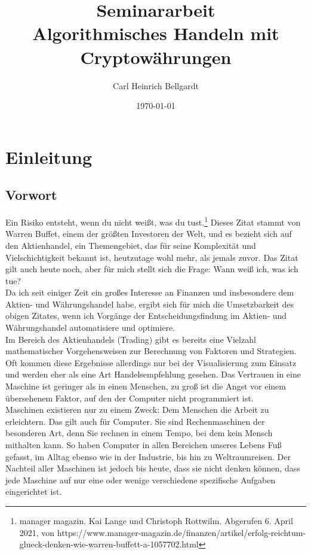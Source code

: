 \documentclass[12pt]{article}
\begin{document}
\begin{titlepage}	
	\title{\LARGE Seminararbeit\\ \large Algorithmisches Handeln mit Cryptowährungen}
	\date{\small \today}
	\author{\small Carl Heinrich Bellgardt}	
	\clearpage\maketitle
	\thispagestyle{empty}
\end{titlepage}

\setcounter{page}{2}
\tableofcontents
\pagebreak
\section{Einleitung}
\subsection{Vorwort}
	\glqq Ein Risiko entsteht, wenn du nicht weißt, was du tust.\grqq{}\footnote{manager magazin. Kai Lange und Christoph Rottwilm. Abgerufen 6. April 2021, von https://www.manager-magazin.de/finanzen/artikel/erfolg-reichtum-glueck-denken-wie-warren-buffett-a-1057702.html} Dieses Zitat stammt von Warren Buffet, einem der größten Investoren der Welt, und es bezieht sich auf den Aktienhandel, ein Themengebiet, das für seine Komplexität und Vielschichtigkeit bekannt ist, heutzutage wohl mehr, als jemals zuvor. Das Zitat gilt auch heute noch, aber für mich stellt sich die Frage: Wann weiß ich, was ich tue?\\
	Da ich seit einiger Zeit ein großes Interesse an Finanzen und insbesondere dem Aktien- und Währungshandel habe, ergibt sich für mich die Umsetzbarkeit des obigen Zitates, wenn ich Vorgänge der Entscheidungsfindung im Aktien- und Währungshandel automatisiere und optimiere.\\
	Im Bereich des Aktienhandels (Trading) gibt es bereits eine Vielzahl mathematischer Vorgehensweisen zur Berechnung von Faktoren und Strategien. Oft kommen diese Ergebnisse allerdings nur bei der Visualisierung zum Einsatz und werden eher als eine Art Handelsempfehlung gesehen. Das Vertrauen in eine Maschine ist geringer als in einen Menschen, zu groß ist die Angst vor einem übersehenem Faktor, auf den der Computer nicht programmiert ist.\\
	Maschinen existieren nur zu einem Zweck: Dem Menschen die Arbeit zu erleichtern. Das gilt auch für Computer. Sie sind Rechenmaschinen der besonderen Art, denn Sie rechnen in einem Tempo, bei dem kein Mensch mithalten kann. So haben Computer in allen Bereichen unseres Lebens Fuß gefasst, im Alltag ebenso wie in der Industrie, bis hin zu Weltraumreisen. Der Nachteil aller Maschinen ist jedoch bis heute, dass sie nicht denken können, dass jede Maschine auf nur eine oder wenige verschiedene spezifische Aufgaben eingerichtet ist.\\
\end{document}
